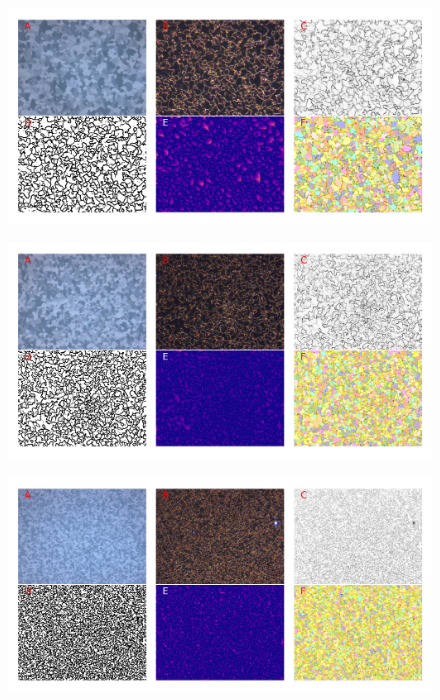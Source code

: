 \documentclass[12pt, titlepage]{article}
\begin{document}
	\begin{figure}[h]
		\centering
		\includegraphics[width=1.0\linewidth]{microstructure_25C.png}
		\caption{}
		\label{fig:micro_25C}
	\end{figure}

	\begin{figure}[h]
		\centering
		\includegraphics[width=1.0\linewidth]{microstructure_30C.png}
		\caption{}
		\label{fig:micro_30C}
	\end{figure}

	\begin{figure}[h]
		\centering
		\includegraphics[width=1.0\linewidth]{microstructure_35C.png}
		\caption{}
		\label{fig:micro_25C}
	\end{figure}
\end{document}
